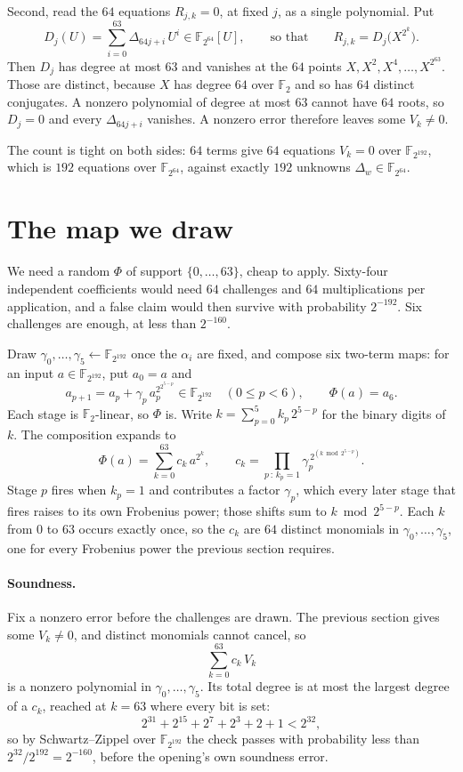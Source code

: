 \documentclass[11pt]{article}
\newcommand{\F}{\mathbb{F}}
\begin{document}
Second, read the $64$ equations $R_{j,k}=0$, at fixed $j$, as a single polynomial. Put
\[
D_j(U)=\sum_{i=0}^{63}\Delta_{64j+i}\,U^i\in\F_{2^{64}}[U],
\qquad\text{so that}\qquad
R_{j,k}=D_j\bigl(X^{2^k}\bigr).
\]
Then $D_j$ has degree at most $63$ and vanishes at the $64$ points $X,X^2,X^4,\dots,X^{2^{63}}$. Those are distinct, because $X$ has degree $64$ over $\F_2$ and so has $64$ distinct conjugates. A nonzero polynomial of degree at most $63$ cannot have $64$ roots, so $D_j=0$ and every $\Delta_{64j+i}$ vanishes. A nonzero error therefore leaves some $V_k\neq0$.

The count is tight on both sides: $64$ terms give $64$ equations $V_k=0$ over $\F_{2^{192}}$, which is $192$ equations over $\F_{2^{64}}$, against exactly $192$ unknowns $\Delta_w\in\F_{2^{64}}$.

\section*{The map we draw}

We need a random $\Phi$ of support $\{0,\dots,63\}$, cheap to apply. Sixty-four independent coefficients would need $64$ challenges and $64$ multiplications per application, and a false claim would then survive with probability $2^{-192}$. Six challenges are enough, at less than $2^{-160}$.

Draw $\gamma_0,\dots,\gamma_5\leftarrow\F_{2^{192}}$ once the $\alpha_i$ are fixed, and compose six two-term maps: for an input $a\in\F_{2^{192}}$, put $a_0=a$ and
\begin{equation}
a_{p+1}=a_p+\gamma_p\,a_p^{2^{2^{5-p}}}\in\F_{2^{192}}\quad(0\le p<6),
\qquad
\Phi(a)=a_6.
\label{eq:phi}
\end{equation}
Each stage is $\F_2$-linear, so $\Phi$ is. Write $k=\sum_{p=0}^{5}k_p\,2^{5-p}$ for the binary digits of $k$. The composition expands to
\begin{equation}
\Phi(a)=\sum_{k=0}^{63}c_k\,a^{2^k},
\qquad
c_k=\prod_{p\,:\,k_p=1}\gamma_p^{\,2^{(k\bmod 2^{5-p})}}.
\label{eq:ck}
\end{equation}
Stage $p$ fires when $k_p=1$ and contributes a factor $\gamma_p$, which every later stage that fires raises to its own Frobenius power; those shifts sum to $k\bmod 2^{5-p}$. Each $k$ from $0$ to $63$ occurs exactly once, so the $c_k$ are $64$ distinct monomials in $\gamma_0,\dots,\gamma_5$, one for every Frobenius power the previous section requires.

\paragraph{Soundness.} Fix a nonzero error before the challenges are drawn. The previous section gives some $V_k\neq0$, and distinct monomials cannot cancel, so
\[
\sum_{k=0}^{63}c_k\,V_k
\]
is a nonzero polynomial in $\gamma_0,\dots,\gamma_5$. Its total degree is at most the largest degree of a $c_k$, reached at $k=63$ where every bit is set:
\[
2^{31}+2^{15}+2^7+2^3+2+1<2^{32},
\]
so by Schwartz--Zippel over $\F_{2^{192}}$ the check passes with probability less than $2^{32}/2^{192}=2^{-160}$, before the opening's own soundness error.
\end{document}
